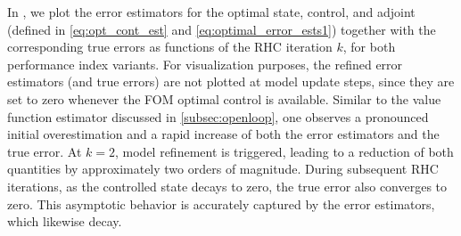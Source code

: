 \documentclass{m2an}
\begin{document}
{In , we plot the error estimators for the optimal state, control, and adjoint (defined in \eqref{eq:opt_cont_est} and \eqref{eq:optimal_error_ests1}) together with the corresponding true errors as functions of the RHC iteration $k$, for both performance index variants.
For visualization purposes, the refined error estimators (and true errors) are not plotted at model update steps, since they are set to zero whenever the FOM optimal control is available. Similar to the value function estimator discussed in \cref{subsec:openloop}, one observes a pronounced initial overestimation and a rapid increase of both the error estimators and the true error. At $k=2$, model refinement is triggered, leading to a reduction of both quantities by approximately two orders of magnitude. During subsequent RHC iterations, as the controlled state decays to zero, the true error also converges to zero. This asymptotic behavior is accurately captured by the error estimators, which likewise decay.
}
\end{document}
